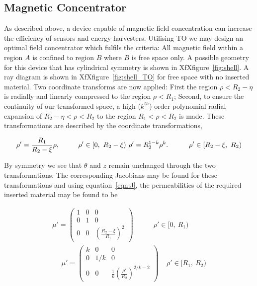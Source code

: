 \documentclass[11pt]{iopart}
\begin{document}
\subsection{Magnetic Concentrator}
As described above, a device capable of magnetic field concentration
can increase the efficiency of sensors and energy harvesters.
Utilising TO we may design an optimal field concentrator which fulfils
the criteria: All magnetic field within a region $A$ is confined to
region $B$ where $B$ is free space only. A possible geometry for this
device that has cylindrical symmetry is shown in
XfXfigure~\ref{fig:shell}. A ray diagram
is shown in XfXfigure~\ref{fig:shell_TO} for free space with no
inserted material. Two coordinate transforms are now applied: First
the region $\rho < R_2 - \eta$ is radially and linearly compressed to
the region $\rho < R_1$; Second, to ensure the continuity of our
transformed space, a high ($k^{th}$) order polynomial radial expansion
of $R_2 - \eta < \rho < R_2$ to the region $R_1 < \rho < R_2$ is
made. These transformations are described by the coordinate
transformations,

\begin{equation}
  \label{transform}
\rho' = \frac{R_1}{R_2-\xi}\rho,~~~~~~~~\rho'\in[0,~R_2-\xi)~~\\
\rho' = R_2^{1-k}\rho^k.~~~~~~~~~\rho'\in[R_2-\xi,~R_2)
\end{equation}

By symmetry we see that $\theta$ and $z$ remain unchanged through the
two transformations. The corresponding Jacobians may be found for
these transformations and using equation~\ref{eqn:J}, the
permeabilities of the required inserted material may be found to be

\begin{equation}
  \label{eqn:mat}
  \begin{split}
 \mu' = \begin{pmatrix}1&0&0\\0&1&0\\0&0&(\frac{R_2-\xi}{R_1})^2\end{pmatrix}~~~~~~~~~~~~~\rho'\in[0,~R_1)~~\\
~~~~~~\mu' = \begin{pmatrix}k&0&0\\0&1/k&0\\0&0&\frac{1}{k}(\frac{\rho'}{R_2})^{2/k-2}\end{pmatrix}~~~~~\rho'\in[R_1,~R_2)
  \end{split}
\end{equation}
\end{document}
